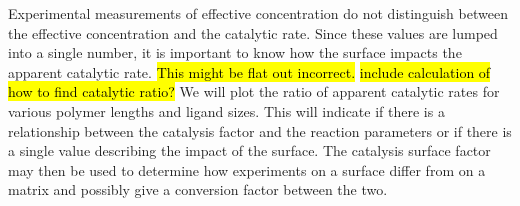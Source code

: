 \documentclass[../../AdvancementSummary.tex]{subfiles}
\begin{document}
Experimental measurements of effective concentration do not distinguish between the effective concentration and the catalytic rate. Since these values are lumped into a single number, it is important to know how the surface impacts the apparent catalytic rate.  \hl{This might be flat out incorrect.} \hl{ include calculation of how to find catalytic ratio?} We will plot the ratio of apparent catalytic rates for various polymer lengths and ligand sizes. This will indicate if there is a relationship between the catalysis factor and the reaction parameters or if there is a single value describing the impact of the surface. The catalysis surface factor may then be used to determine how experiments on a surface differ from on a matrix and possibly give a conversion factor between the two.









\end{document}
